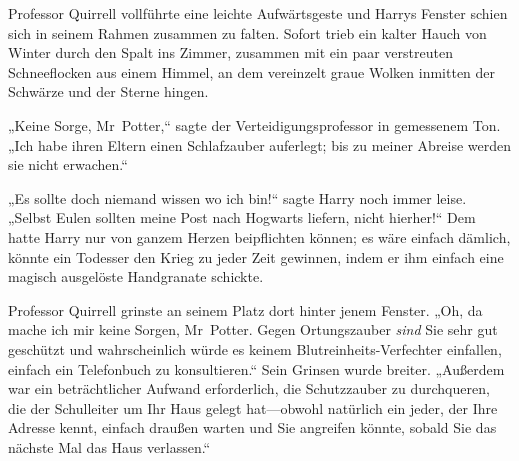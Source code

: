 Professor Quirrell vollführte eine leichte Aufwärtsgeste und Harrys Fenster schien sich in seinem Rahmen zusammen zu falten. Sofort trieb ein kalter Hauch von Winter durch den Spalt ins Zimmer, zusammen mit ein paar verstreuten Schneeflocken aus einem Himmel, an dem vereinzelt graue Wolken inmitten der Schwärze und der Sterne hingen.

„Keine Sorge, Mr~Potter,“ sagte der Verteidigungsprofessor in gemessenem Ton. „Ich habe ihren Eltern einen Schlafzauber auferlegt; bis zu meiner Abreise werden sie nicht erwachen.“

„Es sollte doch niemand wissen wo ich bin!“ sagte Harry noch immer leise. „Selbst Eulen sollten meine Post nach Hogwarts liefern, nicht hierher!“ Dem hatte Harry nur von ganzem Herzen beipflichten können; es wäre einfach dämlich, könnte ein Todesser den Krieg zu jeder Zeit gewinnen, indem er ihm einfach eine magisch ausgelöste Handgranate schickte.

Professor Quirrell grinste an seinem Platz dort hinter jenem Fenster. „Oh, da mache ich mir keine Sorgen, Mr~Potter. Gegen Ortungszauber \emph{sind} Sie sehr gut geschützt und wahrscheinlich würde es keinem Blutreinheits-Verfechter einfallen, einfach ein Telefonbuch zu konsultieren.“ Sein Grinsen wurde breiter. „Außerdem war ein beträchtlicher Aufwand erforderlich, die Schutzzauber zu durchqueren, die der Schulleiter um Ihr Haus gelegt hat—obwohl natürlich ein jeder, der Ihre Adresse kennt, einfach draußen warten und Sie angreifen könnte, sobald Sie das nächste Mal das Haus verlassen.“

